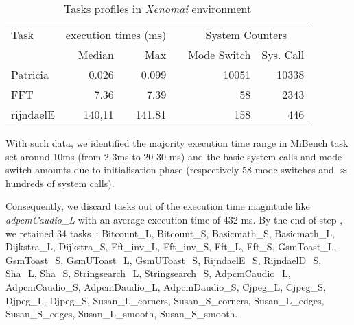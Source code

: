 \documentclass[french, a4paper, 11pt, twoside, pdftex]{StyleThese}
\begin{document}
                    \begin{table}[ht]
                        \centering
                        \caption{Tasks profiles in \textit{Xenomai} environment}
                        \begin{tabular}{@{}lrrcrr@{}}
                        \toprule
                        Task & \multicolumn{2}{c}{execution times (ms)} & \phantom{} & \multicolumn{2}{c}{System Counters} \\ %
                        \cmidrule{2-3} \cmidrule{5-6}
                                    &   Median      &   Max    &&   Mode Switch & Sys. Call     \\
                        \midrule
                        Patricia    &   0.026       &   0.099       &&  10051        & 10338    \\
                        FFT         &   7.36        &   7.39        &&  58           & 2343      \\
                        rijndaelE   &   140,11      &   141.81      &&  158          & 446       \\
                        \bottomrule
                        \end{tabular}
                                \label{tab:xenoIsol}
                    \end{table}
                    \smallbreak
                
                    With such data, we identified the majority execution time range in MiBench task set around 10ms (from 2-3ms to 20-30 ms) and the basic system calls and mode switch amounts due to initialisation phase (respectively 58 mode switches and $\approx$hundreds of system calls).
            
                    Consequently, we discard tasks out of the execution time magnitude like \textit{adpcmCaudio\_L } with an average execution time of 432 ms.
                    By the end of step \circleTxt[1], we retained 34 tasks~: Bitcount\_L,       Bitcount\_S, Basicmath\_S, Basicmath\_L, Dijkstra\_L, Dijkstra\_S, Fft\_inv\_L, Fft\_inv\_S, Fft\_L, Fft\_S, GsmToast\_L, GsmToast\_S, GsmUToast\_L, GsmUToast\_S, RijndaelE\_S, RijndaelD\_S, Sha\_L, Sha\_S, Stringsearch\_L, Stringsearch\_S, AdpcmCaudio\_L, AdpcmCaudio\_S, AdpcmDaudio\_L, AdpcmDaudio\_S, Cjpeg\_L, Cjpeg\_S, Djpeg\_L, Djpeg\_S, Susan\_L\_corners, Susan\_S\_corners, Susan\_L\_edges, Susan\_S\_edges, Susan\_L\_smooth, Susan\_S\_smooth.  
\end{document}
